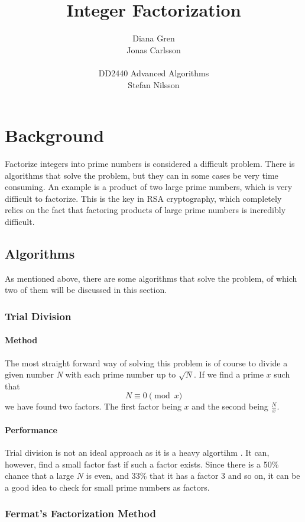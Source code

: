 \documentclass[a4paper, 12pt]{report}
\title{Integer Factorization}
\author{Diana Gren \\ Jonas Carlsson \\\\ DD2440 Advanced Algorithms \\ Stefan Nilsson}
\date{}
\begin{document}
\maketitle
\tableofcontents
\newpage
\chapter{Background}
Factorize integers into prime numbers is considered a difficult problem. There is algorithms that solve the problem, but they can in some cases be very time consuming. An example is a product of two large prime numbers, which is very difficult to factorize. This is the key in RSA cryptography, which completely relies on the fact that factoring products of large prime numbers is incredibly difficult.

\section{Algorithms}
As mentioned above, there are some algorithms that solve the problem, of which two of them will be discussed in this section.

\subsection{Trial Division}
\subsubsection{Method}
The most straight forward way of solving this problem is of course to divide a given number \emph{N} with each prime number up to $ \sqrt{N} $. If we find a prime $x$ such that
\begin{equation}
N \equiv 0 \pmod x
\end{equation}
we have found two factors. The first factor being $x$ and the second being $ \frac{N}{x} $.

\subsubsection{Performance}
Trial division is not an ideal approach as it is a heavy algortihm \cite{trial}. It can, however, find a small factor fast if such a factor exists. Since there is a 50\% chance that a large $N$ is even, and 33\% that it has a factor 3 and so on, it can be a good idea to check for small prime numbers as factors.

\subsection{Fermat's Factorization Method}
\end{document}
